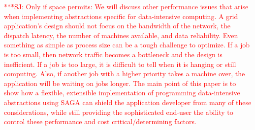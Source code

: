 \documentclass[conference,final]{IEEEtran}
\newcommand{\jhanote}[1]{ {\textcolor{red} { ***SJ: #1 }}}
\newcommand{\jhanote}[1]{}
\begin{document}
\jhanote{Only if space permits: We will discuss other performance
  issues that arise when implementing abstractions specific for
  data-intensive computing.  A grid application's design should not
  focus on the bandwidth of the network, the dispatch latency, the
  number of machines available, and data reliability.  Even something
  as simple as process size can be a tough challenge to optimize.  If
  a job is too small, then network traffic becomes a bottleneck and
  the design is inefficient.  If a job is too large, it is difficult
  to tell when it is hanging or still computing.  Also, if another job
  with a higher priority takes a machine over, the application will be
  waiting on jobs longer.  The main point of this paper is to show how
  a flexible, extensible implementation of programming data-intensive
  abstractions using SAGA can shield the application developer from
  many of these considerations, while still providing the
  sophisticated end-user the ability to control these performance and
  cost critical/determining factors.}


\end{document}
